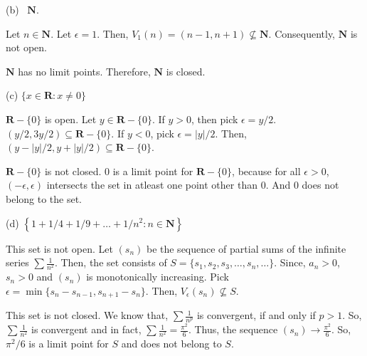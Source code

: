 \documentclass[10pt]{article}
\begin{document}
(b) \ $\displaystyle \mathbf{N}$.



Let $\displaystyle n\in \mathbf{N}$. Let $\displaystyle \epsilon =1$. Then, $\displaystyle V_{1}( n) =( n-1,n+1) \nsubseteq \mathbf{N}$. Consequently, $\displaystyle \mathbf{N}$ is not open.



$\displaystyle \mathbf{N}$ has no limit points. Therefore, $\displaystyle \mathbf{N}$ is closed.



(c) $\displaystyle \{x\in \mathbf{R} :x\neq 0\}$



$\displaystyle \mathbf{R} -\{0\}$ is open. Let $\displaystyle y\in \mathbf{R} -\{0\}$. If $\displaystyle y >0$, then pick $\displaystyle \epsilon =y/2$. $\displaystyle ( y/2,3y/2) \subseteq \mathbf{R} -\{0\}$. If $\displaystyle y< 0$, pick $\displaystyle \epsilon =|y|/2$. Then, $\displaystyle ( y-|y|/2,y+|y|/2) \subseteq \mathbf{R} -\{0\}$. 



$\displaystyle \mathbf{R} -\{0\}$ is not closed. $\displaystyle 0$ is a limit point for $\displaystyle \mathbf{R} -\{0\}$, because for all $\displaystyle \epsilon  >0$, $\displaystyle ( -\epsilon ,\epsilon )$ intersects the set in atleast one point other than $\displaystyle 0$. And $\displaystyle 0$ does not belong to the set.



(d) $\displaystyle \left\{1+1/4+1/9+\dotsc +1/n^{2} :n\in \mathbf{N}\right\}$



This set is not open. Let $\displaystyle ( s_{n})$ be the sequence of partial sums of the infinite series $\displaystyle \sum \frac{1}{n^{2}}$. Then, the set consists of $\displaystyle S=\{s_{1} ,s_{2} ,s_{3} ,\dotsc ,s_{n} ,\dotsc \}$. Since, $\displaystyle a_{n}  >0$, $\displaystyle s_{n}  >0$ and $\displaystyle ( s_{n})$ is monotonically increasing. Pick $\displaystyle \epsilon =\min\{s_{n} -s_{n-1} ,s_{n+1} -s_{n}\}$. Then, $\displaystyle V_{\epsilon }( s_{n}) \nsubseteq S$. 



This set is not closed. We know that, $\displaystyle \sum \frac{1}{n^{p}}$ is convergent, if and only if $\displaystyle p >1$. So, $\displaystyle \sum \frac{1}{n^{2}}$ is convergent and in fact, $\displaystyle \sum \frac{1}{n^{2}} =\frac{\pi ^{2}}{6}$. Thus, the sequence $\displaystyle ( s_{n})\rightarrow \frac{\pi ^{2}}{6}$. So, $\displaystyle \pi ^{2} /6$ is a limit point for $\displaystyle S$ and does not belong to $\displaystyle S$.
\end{document}
